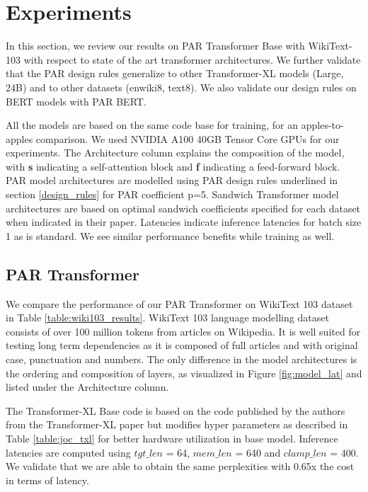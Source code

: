\documentclass[11pt]{article}
\begin{document}
\section{Experiments}

In this section, we review our results on PAR Transformer Base with WikiText-103 with respect to state of the art transformer architectures. We further validate that the PAR design rules generalize to other Transformer-XL models (Large, 24B) and to other datasets (enwiki8, text8). We also validate our design rules on BERT models with PAR BERT. 

All the models are based on the same code base for training, for an apples-to-apples comparison. We used NVIDIA A100 40GB Tensor Core GPUs for our experiments. The Architecture column explains the composition of the model, with \textbf{s} indicating a self-attention block and \textbf{f} indicating a feed-forward block. PAR model architectures are modelled using PAR design rules underlined in section \ref{design_rules} for PAR coefficient p=5. Sandwich Transformer model architectures are based on optimal sandwich coefficients specified for each dataset when indicated in their paper. Latencies indicate inference latencies for batch size 1 as is standard. We see similar performance benefits while training as well.

\subsection{PAR Transformer}

We compare the performance of our PAR Transformer on WikiText 103 dataset in Table \ref{table:wiki103_results}. WikiText 103 language modelling dataset consists of over 100 million tokens from articles on Wikipedia. It is well suited for testing long term dependencies as it is composed of full articles and with original case, punctuation and numbers. The only difference in the model architectures is the ordering and composition of layers, as visualized in Figure \ref{fig:model_lat} and listed under the Architecture column. 

The Transformer-XL Base code is based on the code published by the authors from the Transformer-XL paper but modifies hyper parameters as described in Table \ref{table:joc_txl} for better hardware utilization in base model. Inference latencies are computed using $tgt\_len$ = 64, $mem\_len$ = 640 and $clamp\_len$ = 400. We validate that we are able to obtain the same perplexities with 0.65x the cost in terms of latency. 
\end{document}
